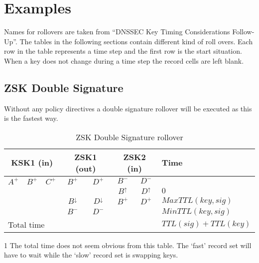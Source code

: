 \documentclass[twoside, a4paper]{article}
\begin{document}
\section{Examples}

Names for rollovers are taken from ``DNSSEC Key Timing 
Considerations Follow-Up''. The tables in the following sections 
contain different kind of roll overs. Each row in the table 
represents a time step and the first row is the start situation. 
When a key does not change during a time step the record cells are left 
blank.

\subsection{ZSK Double Signature}
Without any policy directives a double signature rollover will be executed
as this is the fastest way.

\begin{table}[h]
	\centering
	\begin{threeparttable} 
		
		\begin{tabular}{ |ccc|cc|cc|l| }
		\hline
		\multicolumn{3}{|c|}{KSK1 (in)} & \multicolumn{2}{c|}{ZSK1 (out)} & \multicolumn{2}{c|}{ZSK2 (in)} & Time\\
		\hline
		$A^{+}$ & $B^{+}$ & $C^{+}$ & $B^{+}$          & $D^{+}$          & $B^{-}$        & $D^{-}$        & \\
				&         &         &                  &                  & $B^{\uparrow}$ & $D^{\uparrow}$ & $0$\\
				&         &         & $B^{\downarrow}$ & $D^{\downarrow}$ & $B^{+}$        & $D^{+}$        & $MaxTTL(key, sig)$\\
				&         &         & $B^{-}$          & $D^{-}$          &                &                & $MinTTL(key, sig)$\\
		\hline
		\multicolumn{7}{|l|}{Total time} & $TTL(sig) + TTL(key)$\tnote{1}\\
		\hline
		\end{tabular}
		
		\begin{tablenotes}[para]
		\item[1] The total time does not seem obvious from this table.
			The `fast' record set will have to wait while the `slow'
			record set is swapping keys.
		\end{tablenotes}
		
	\end{threeparttable}
	\caption{ZSK Double Signature rollover}
	\label{tab:roll_dubsig}
\end{table}
\end{document}
